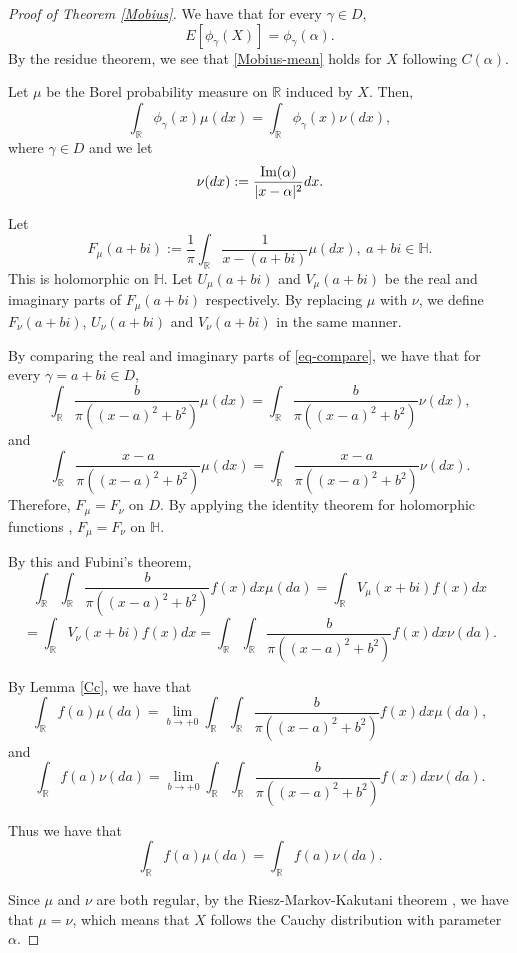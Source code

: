 \documentclass[a4paper, reqno, 11pt]{amsart}
\theoremstyle{definition}
\begin{document}
\begin{proof}[Proof of Theorem \ref{Mobius}] 
We have that for every $\gamma \in D$, 
\begin{equation}\label{Mobius-mean} 
E\left[ \phi_{\gamma}(X)  \right] = \phi_{\gamma}(\alpha). 
\end{equation}
By the residue theorem, 
we see that \eqref{Mobius-mean} holds for $X$ following $C(\alpha)$. 
  
Let $\mu$ be the Borel probability measure on $\mathbb{R}$ induced by $X$.  
Then, 
\begin{equation}\label{eq-compare} 
\int_{\mathbb{R}} \phi_{\gamma}(x) \mu(dx) = \int_{\mathbb{R}} \phi_{\gamma}(x)  \nu(dx),  
\end{equation}
where $\gamma \in D$ and  we let 
\[ \nu(dx) := \frac{\textup{Im}(\alpha)}{|x - \alpha|^2} dx.  \]

Let $$F_{\mu}(a+bi) := \frac{1}{\pi} \int_{\mathbb{R}} \frac{1}{x - (a+bi)} \mu(dx), \ a+bi \in \mathbb{H}.$$
This is holomorphic on $\mathbb{H}$. 
Let $U_{\mu}(a+bi)$ and $V_{\mu}(a+bi)$ be the real and imaginary parts of $F_{\mu}(a+bi)$ respectively. 
By replacing $\mu$ with $\nu$, we define $F_{\nu}(a+bi)$, $U_{\nu}(a+bi)$ and $V_{\nu}(a+bi)$ in the same manner.  

By comparing the real and imaginary parts of \eqref{eq-compare}, 
we have that 
for every $\gamma = a+bi \in D$, 
\[ \int_{\mathbb{R}} \frac{b}{\pi((x-a)^2 + b^2)} \mu(dx) = \int_{\mathbb{R}}  \frac{b}{\pi((x-a)^2 + b^2)} \nu(dx),  \]
and 
\[ \int_{\mathbb{R}} \frac{x-a}{\pi((x-a)^2 + b^2)} \mu(dx) = \int_{\mathbb{R}}  \frac{x-a}{\pi((x-a)^2 + b^2)} \nu(dx). \]
Therefore, 
 $F_{\mu} = F_{\nu}$ on $D$. 
By applying  the identity theorem for holomorphic functions \cite[Theorem 10.18]{Rudin1987},  
$F_{\mu} = F_{\nu}$ on $\mathbb{H}$.


By this and Fubini's theorem,  
\[ \int_{\mathbb{R}} \int_{\mathbb{R}} \frac{b}{\pi((x-a)^2 + b^2)} f(x) dx  \mu(da) = \int_{\mathbb{R}} V_{\mu}(x+bi) f(x) dx \]
\[ = \int_{\mathbb{R}} V_{\nu}(x+bi)  f(x) dx = \int_{\mathbb{R}} \int_{\mathbb{R}} \frac{b}{\pi((x-a)^2 + b^2)} f(x) dx  \nu(da).  \]

By Lemma \ref{Cc}, we have that 
\[ \int_{\mathbb{R}} f(a)  \mu(da)  = \lim_{b \to +0} \int_{\mathbb{R}} \int_{\mathbb{R}} \frac{b}{\pi((x-a)^2 + b^2)} f(x) dx  \mu(da), \]
and 
\[ \int_{\mathbb{R}} f(a)  \nu(da)  = \lim_{b \to +0} \int_{\mathbb{R}} \int_{\mathbb{R}} \frac{b}{\pi((x-a)^2 + b^2)} f(x) dx  \nu(da). \]

Thus we have that 
\[ \int_{\mathbb{R}} f(a)  \mu(da)  = \int_{\mathbb{R}} f(a)  \nu(da).  \]

Since $\mu$ and $\nu$ are both  regular, by the Riesz-Markov-Kakutani theorem \cite[Theorem 6.19]{Rudin1987}, 
we have that $\mu = \nu$, which means that $X$ follows the Cauchy distribution with parameter $\alpha$.  
\end{proof}
\end{document}
